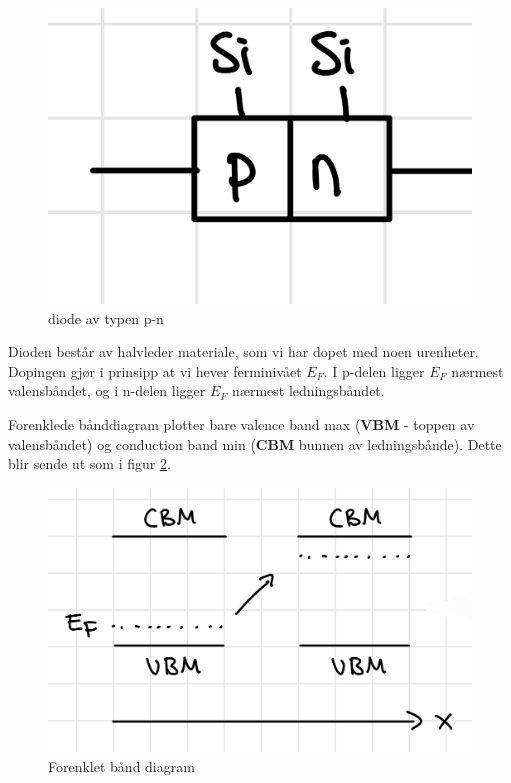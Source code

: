 \begin{figure}[!htb]
    \centering
    \includegraphics[scale=0.2]{Bilder/SamtaleTema6/diode.jpeg}
    \caption{diode av typen p-n}
    \label{fig:p-n}
\end{figure}

Dioden består av halvleder materiale, som vi har dopet med noen urenheter. Dopingen gjør i prinsipp at vi hever ferminivået $E_F$. I p-delen ligger $E_F$ nærmest valensbåndet, og i n-delen ligger $E_F$ nærmest ledningsbåndet.

Forenklede bånddiagram plotter bare valence band max (\textbf{VBM} - toppen av valensbåndet) og conduction band min (\textbf{CBM} bunnen av ledningsbånde). Dette blir sende ut som i figur \ref{fig:forenkl}.

\begin{figure}[!htb]
    \centering
    \includegraphics[scale=0.2]{Bilder/SamtaleTema6/forenklet.jpeg}
    \caption{Forenklet bånd diagram}
    \label{fig:forenkl}
\end{figure}

